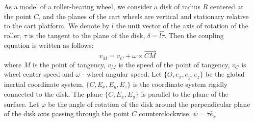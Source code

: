 \documentclass[oneside,final,14pt]{extreport}
\begin{document}
 As a model of a roller-bearing wheel, we consider a disk of radius $ R $ centered at the point $ C $, and the planes of the cart wheels are vertical and stationary relative to the cart platform. We denote by $ l $ the unit vector of the axis of rotation of the roller, $ \tau $ is the tangent to the plane of the disk, $ \delta = \widehat{l \tau} $. Then the coupling equation is written as follows:
\begin{equation}
v_{M}
=
v_{C}
+
\omega
\times
\overrightarrow{CM}
\end{equation}
where $ M $ is the point of tangency, $ v_{M} $ is the speed of the point of tangency, $ v_{C} $ is
wheel center speed and $ \omega $ - wheel angular speed.
Let $ \{O, e_{x}, e_{y}, e_{z} \} $ be the global inertial coordinate system, $ \{C, E_{x}, E_{y}, E_{z} \} $ is the coordinate system rigidly connected to the disk. The plane $ \{C, E_{x}, E_{y} \} $ is parallel to the plane of the surface. Let $ \varphi $ be the angle of rotation of the disk around the perpendicular plane of the disk axis passing through the point $ C $ counterclockwise, $ \psi = \widehat{\tau e_{x}} $
\end{document}
